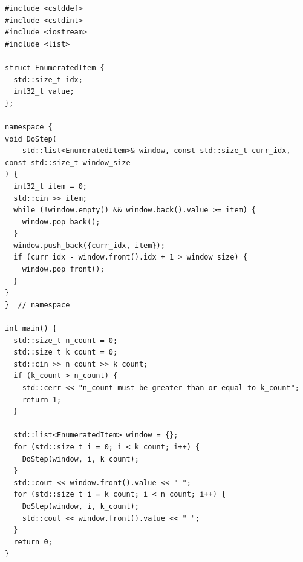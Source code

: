 \begin{lstlisting}
#include <cstddef>
#include <cstdint>
#include <iostream>
#include <list>

struct EnumeratedItem {
  std::size_t idx;
  int32_t value;
};

namespace {
void DoStep(
    std::list<EnumeratedItem>& window, const std::size_t curr_idx, const std::size_t window_size
) {
  int32_t item = 0;
  std::cin >> item;
  while (!window.empty() && window.back().value >= item) {
    window.pop_back();
  }
  window.push_back({curr_idx, item});
  if (curr_idx - window.front().idx + 1 > window_size) {
    window.pop_front();
  }
}
}  // namespace

int main() {
  std::size_t n_count = 0;
  std::size_t k_count = 0;
  std::cin >> n_count >> k_count;
  if (k_count > n_count) {
    std::cerr << "n_count must be greater than or equal to k_count";
    return 1;
  }

  std::list<EnumeratedItem> window = {};
  for (std::size_t i = 0; i < k_count; i++) {
    DoStep(window, i, k_count);
  }
  std::cout << window.front().value << " ";
  for (std::size_t i = k_count; i < n_count; i++) {
    DoStep(window, i, k_count);
    std::cout << window.front().value << " ";
  }
  return 0;
}
\end{lstlisting}